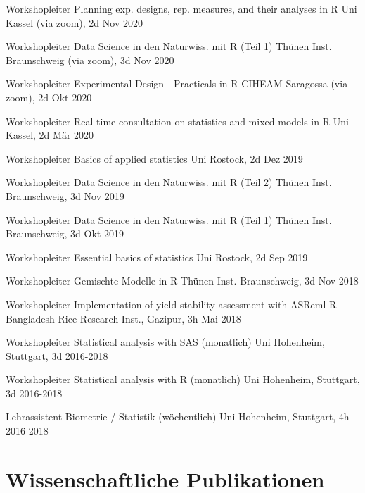 \documentclass[11pt, a4paper]{awesome-cv}
\begin{document}
\begin{cvhonors}

  \cvhonor
    {Workshopleiter  }
    {Planning exp. designs, rep. measures, and their analyses in R}
    {Uni Kassel (via zoom), 2d}
    {Nov 2020  }
    
  \cvhonor
    {Workshopleiter  }
    {Data Science in den Naturwiss. mit R (Teil 1)}
    {Thünen Inst. Braunschweig (via zoom), 3d}
    {Nov 2020  } 
    
  \cvhonor
    {Workshopleiter  }
    {Experimental Design - Practicals in R}
    {CIHEAM Saragossa (via zoom), 2d}
    {Okt 2020  }

  \cvhonor
    {Workshopleiter  }
    {Real-time consultation on statistics and mixed models in R}
    {Uni Kassel, 2d}
    {Mär 2020  }
    
  \cvhonor
    {Workshopleiter  }
    {Basics of applied statistics}
    {Uni Rostock, 2d}
    {Dez 2019  }
  
  \cvhonor
    {Workshopleiter  }
    {Data Science in den Naturwiss. mit R (Teil 2)}
    {Thünen Inst. Braunschweig, 3d}
    {Nov 2019  }    

  \cvhonor
    {Workshopleiter  }
    {Data Science in den Naturwiss. mit R (Teil 1)}
    {Thünen Inst. Braunschweig, 3d}
    {Okt 2019  }      

  \cvhonor
    {Workshopleiter  }
    {Essential basics of statistics}
    {Uni Rostock, 2d}
    {Sep 2019  }  

  \cvhonor
    {Workshopleiter  }
    {Gemischte Modelle in R}
    {Thünen Inst. Braunschweig, 3d}
    {Nov 2018  }  
    
  \cvhonor
    {Workshopleiter  }
    {Implementation of yield stability assessment with ASReml-R}
    {Bangladesh Rice Research Inst., Gazipur, 3h}
    {Mai 2018  }
    
  \cvhonor
    {Workshopleiter  }
    {Statistical analysis with SAS (monatlich)}
    {Uni Hohenheim, Stuttgart, 3d}
    {2016-2018  }
    
  \cvhonor
    {Workshopleiter  }
    {Statistical analysis with R (monatlich)}
    {Uni Hohenheim, Stuttgart, 3d}
    {2016-2018  }
    
  \cvhonor
    {Lehrassistent  }
    {Biometrie / Statistik (wöchentlich)}
    {Uni Hohenheim, Stuttgart, 4h}
    {2016-2018  }
        
\end{cvhonors}

\hypertarget{wissenschaftliche-publikationen}{%
\section{Wissenschaftliche
Publikationen}\label{wissenschaftliche-publikationen}}
\end{document}
